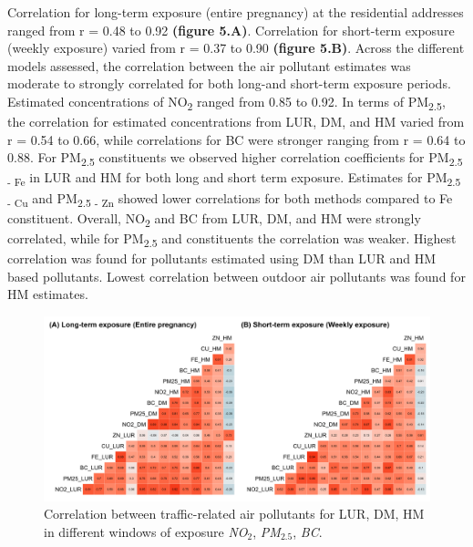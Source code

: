 \documentclass{article}
\begin{document}
Correlation for long-term exposure (entire pregnancy) at the residential addresses ranged from r = 0.48 to 0.92 \textbf{(figure 5.A)}. Correlation for short-term exposure (weekly exposure) varied from r = 0.37 to 0.90 \textbf{(figure 5.B)}. Across the different models assessed, the correlation between the air pollutant estimates was moderate to strongly correlated for both long-and short-term exposure periods. Estimated concentrations of NO\textsubscript{2} ranged from 0.85 to 0.92. In terms of PM\textsubscript{2.5}, the correlation for estimated concentrations from LUR, DM, and HM varied from r = 0.54 to 0.66, while correlations for BC were stronger ranging from r = 0.64 to 0.88. For PM\textsubscript{2.5} constituents we observed higher correlation coefficients for PM\textsubscript{2.5 - Fe} in LUR and HM for both long and short term exposure. Estimates for PM\textsubscript{2.5 - Cu} and PM\textsubscript{2.5 - Zn} showed lower correlations for both methods compared to Fe constituent. Overall, NO\textsubscript{2} and BC from LUR, DM, and HM were strongly correlated, while for PM\textsubscript{2.5} and constituents the correlation was weaker. Highest correlation was found for pollutants estimated using DM than LUR and HM based pollutants. Lowest correlation between outdoor air pollutants was found for HM estimates. 

\captionsetup[figure]{skip=6pt}
\begin{figure}[!h]
\includegraphics[width=1.0\textwidth]{figures/correlation_fig_v2.png}
\caption{Correlation between traffic-related air pollutants for LUR, DM, HM in different windows of exposure \textit{NO$_2$}, \textit{PM$_{2.5}$}, \textit{BC}.}
\label{fig5}
\end{figure}
\end{document}
